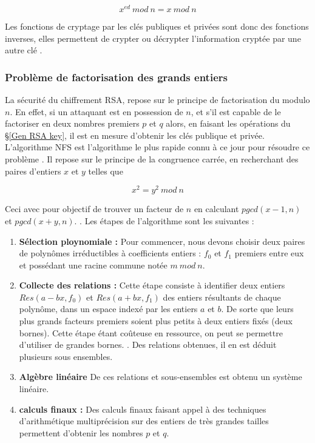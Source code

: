 \[x^{ed} \: mod \: n = x \: mod \: n\]

Les fonctions de cryptage par les clés publiques et privées sont donc des fonctions inverses, elles permettent de crypter ou décrypter l'information cryptée par une autre clé \cite{cormen_algorithmes_2013}.

\subsubsection{Problème de factorisation des grands entiers}

La sécurité du chiffrement RSA, repose sur le principe de factorisation du modulo $n$. En effet, si un attaquant est en possession de $n$, et s'il est capable de le factoriser en deux nombres premiers $p$ et $q$ alors, en faisant les opérations du §\ref{Gen RSA key}, il est en mesure d'obtenir les clés publique et privée.\cite{hostalot_attaque_nodate}\\

L'algorithme NFS est l'algorithme le plus rapide connu à ce jour pour résoudre ce problème \cite{hostalot_attaque_nodate}. Il repose sur le principe de la congruence carrée, en recherchant des paires d'entiers $x$ et $y$ telles que


\[x^2 = y^2 \: mod \: n\]

Ceci avec pour objectif de trouver un facteur de $n$ en calculant $pgcd(x-1,n)$ et $pgcd(x+y,n)$. \cite{bouvier_algorithmes_2015}. Les étapes de l'algorithme sont les suivantes :

\begin{enumerate}
    \item \textbf{Sélection ploynomiale :} Pour commencer, nous devons choisir deux paires de polynômes irréductibles à coefficients entiers : $f_0$ et $f_1$ premiers entre eux et possédant une racine commune notée $m \: mod \: n$.\cite{bouvier_algorithmes_2015}

    \item \textbf{Collecte des relations :} Cette étape consiste à identifier deux entiers $Res(a-bx, f_0)$ et $Res(a+bx, f_1)$ des entiers résultants de chaque polynôme, dans un espace indexé par les entiers $a$ et $b$. De sorte que leurs plus grands facteurs premiers soient plus petits à deux entiers fixés (deux bornes). Cette étape étant coûteuse en ressource, on peut se permettre d'utiliser de grandes bornes. \cite{hostalot_attaque_nodate}. Des relations obtenues, il en est déduit plusieurs sous ensembles. 

    \item \textbf{Algèbre linéaire} De ces relations et sous-ensembles est obtenu un système linéaire.\cite{hostalot_attaque_nodate}

    \item \textbf{calculs finaux :} Des calculs finaux faisant appel à des techniques d’arithmétique multiprécision sur des entiers de très grandes tailles permettent d'obtenir les nombres $p$ et $q$. \cite{hostalot_attaque_nodate}

\end{enumerate}

